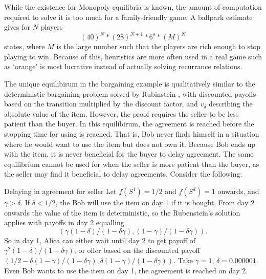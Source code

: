 While the existence for Monopoly equilibria is known, the amount of computation required to solve it is too much for a family-friendly game. A ballpark estimate gives for $N$ players \[
(40)^N * (28)^{N+1} * 6^8 * (M)^N\] states, where $M$ is the large number such that the players are rich enough to stop playing to win. Because of this, heuristics are more often used in a real game such as `orange' is most lucrative instead of actually solving recurrance relations.

The unique equilibirum in the bargaining example is qualitatively similar to the deterministic bargaining problem solved by Rubinstein \cite{Cripps1998}, with discounted payoffs based on the transition multiplied by the discount factor, and $v_\delta$ describing the absolute value of the item. However, the proof requires the seller to be less patient than the buyer. In this equilibirum, the agreement is reached before the stopping time for using is reached. That is, Bob never finds himself in a situation where he would want to use the item but does not own it. Because Bob ends up with the item, it is never beneficial for the buyer to delay agreement. The same equilibrium cannot be used for when the seller is more patient than the buyer, as the seller may find it beneficial to delay agreements. Consider the following:\begin{aexample}{Delaying in agreement for seller}{}
    Let $f(S^1)={1/2}$ and $f(S^d)=1$ onwards, and $\gamma >\delta$. If $\delta<1/2$, the Bob will use the item on day $1$ if it is bought. From day 2 onwards the value of the item is deterministic, so the Rubenstein's solution applies with payoffs in day 2 equalling \[
    (\gamma (1-\delta)/(1-\delta\gamma), (1-\gamma)/(1-\delta\gamma)).
    \] 
    So in day 1, Alica can either wait until day 2 to get payoff of $\gamma^2 (1-\delta)/(1-\delta\gamma)$, or offer based on the discounted payoff $(1/2 - \delta(1-\gamma)/(1-\delta\gamma),\delta(1-\gamma)/(1-\delta\gamma))$. Take $\gamma=1$, $\delta = 0.000001$. Even Bob wants to use the item on day 1, the agreement is reached on day 2.
\end{aexample}

